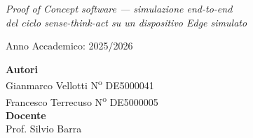 \begin{titlepage}
\begin{center}
\vspace{0.6cm}
{\large\itshape Proof of Concept software --- simulazione end-to-end\\ del ciclo \emph{sense-think-act} su un dispositivo Edge simulato\par}

\vspace{0.8cm}
{\normalsize Anno Accademico: 2025/2026\par}

\vfill

\begin{minipage}[b]{0.55\textwidth}
    \raggedright
    \textbf{Autori}\\[4pt]
    Gianmarco Vellotti \quad N\textsuperscript{o} DE5000041\\
    Francesco Terrecuso \quad N\textsuperscript{o} DE5000005 \\[10pt]
    \textbf{Docente}\\[4pt]
    Prof. Silvio Barra
\end{minipage}
\hfill

\vspace{0.4cm}

\end{center}
\end{titlepage}
